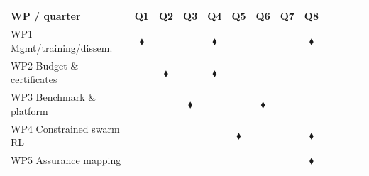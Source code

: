 \documentclass[11pt,a4paper]{article}
\begin{document}
\begin{center}
\footnotesize
\begin{tabular}{@{}l|cccccccccccc@{}}
\toprule
\textbf{WP / quarter} & Q1 & Q2 & Q3 & Q4 & Q5 & Q6 & Q7 & Q8 & & & & \\
\midrule
WP1 Mgmt/training/dissem. & \cellcolor{LightGold}$\blacklozenge$ & \cellcolor{LightGold} & \cellcolor{LightGold} & \cellcolor{LightGold}$\blacklozenge$ & \cellcolor{LightGold} & \cellcolor{LightGold} & \cellcolor{LightGold} & \cellcolor{LightGold}$\blacklozenge$ & & & & \\
WP2 Budget \& certificates & \cellcolor{LightBlue} & \cellcolor{LightBlue}$\blacklozenge$ & \cellcolor{LightBlue} & \cellcolor{LightBlue}$\blacklozenge$ & & & & & & & & \\
WP3 Benchmark \& platform & \cellcolor{LightBlue} & \cellcolor{LightBlue} & \cellcolor{LightBlue}$\blacklozenge$ & \cellcolor{LightBlue} & \cellcolor{LightBlue} & \cellcolor{LightBlue}$\blacklozenge$ & & & & & & \\
WP4 Constrained swarm RL & & & \cellcolor{LightBlue} & \cellcolor{LightBlue} & \cellcolor{LightBlue}$\blacklozenge$ & \cellcolor{LightBlue} & \cellcolor{LightBlue} & \cellcolor{LightBlue}$\blacklozenge$ & & & & \\
WP5 Assurance mapping & & & & & \cellcolor{LightBlue} & \cellcolor{LightBlue} & \cellcolor{LightBlue} & \cellcolor{LightBlue}$\blacklozenge$ & & & & \\
\bottomrule
\end{tabular}
\end{center}
\end{document}
